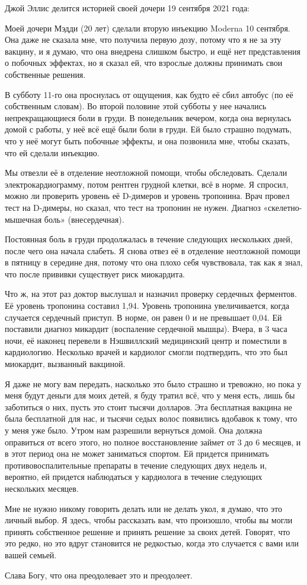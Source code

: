 Джой Эллис делится историей своей дочери 19 сентября 2021 года:

Моей дочери Мэдди (20 лет) сделали вторую инъекцию Moderna 10 сентября. Она даже
не сказала мне, что получила первую дозу, потому что я не за эту вакцину, и я
думаю, что она внедрена слишком быстро, и ещё нет представления о побочных
эффектах, но я сказал ей, что взрослые должны принимать свои собственные
решения.

В субботу 11-го она проснулась от ощущения, как будто её сбил автобус (по её
собственным словам). Во второй половине этой субботы у нее начались
непрекращающиеся боли в груди. В понедельник вечером, когда она вернулась домой
с работы, у неё всё ещё были боли в груди. Ей было страшно подумать, что у неё
могут быть побочные эффекты, и она позвонила мне, чтобы сказать, что ей сделали
инъекцию.

Мы отвезли её в отделение неотложной помощи, чтобы обследовать. Сделали
электрокардиограмму, потом рентген грудной клетки, всё в норме. Я спросил, можно
ли проверить уровень её D-димеров и уровень тропонина. Врач провел тест на
D-димеры, но сказал, что тест на тропонин не нужен. Диагноз «скелетно-мышечная
боль» (внесердечная).

Постоянная боль в груди продолжалась в течение следующих нескольких дней, после
чего она начала слабеть. Я снова отвез её в отделение неотложной помощи в
пятницу в середине дня, потому что она плохо себя чувствовала, так как я знал,
что после прививки существует риск миокардита.

Что ж, на этот раз доктор выслушал и назначил проверку сердечных ферментов. Её
уровень тропонина составил 1,94. Уровень тропонина увеличивается, когда
случается сердечный приступ. В норме, он равен 0 и не превышает 0,04.  Ей
поставили диагноз микардит (воспаление сердечной мышцы). Вчера, в 3 часа ночи,
её наконец перевели в Нэшвиллский медицинский центр и поместили в
кардиологию. Несколько врачей и кардиолог смогли подтвердить, что это был
миокардит, вызванный вакциной.


Я даже не могу вам передать, насколько это было страшно и тревожно, но пока у
меня будут деньги для моих детей, я буду тратил всё, что у меня есть, лишь бы
заботиться о них, пусть это стоит тысячи долларов. Эта бесплатная вакцина не
была бесплатной для нас, и тысячи седых волос появились вдобавок к тому, что у
меня уже было. Утром нам разрешили вернуться домой. Она должна оправиться от
всего этого, но полное восстановление займет от 3 до 6 месяцев, и в этот период
она не может заниматься спортом. Ей придется принимать противовоспалительные
препараты в течение следующих двух недель и, вероятно, ей придется наблюдаться у
кардиолога в течение следующих нескольких месяцев.

Мне не нужно никому говорить делать или не делать укол, я думаю, что это личный
выбор. Я здесь, чтобы рассказать вам, что произошло, чтобы вы могли принять
собственное решение и принять решение за своих детей. Говорят, что это редко, но
это вдруг становится не редкостью, когда это случается с вами или вашей семьей.

Слава Богу, что она преодолевает это и преодолеет.
